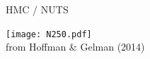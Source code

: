\documentclass[finnish,english,t]{beamer}
\begin{document}









\begin{frame}{HMC / NUTS}

  \vspace{-.5\baselineskip}
  \texttt{[image: N250.pdf]}\\
  {\scriptsize from Hoffman \& Gelman (2014)}

\end{frame}




\end{document}
